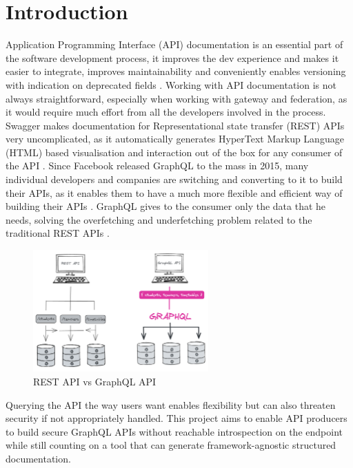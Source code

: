 \section*{Introduction}
\label{s:Introduction}
Application Programming Interface (API) documentation is an essential part of
the software development process, it improves the dev experience and makes it
easier to integrate, improves maintainability and conveniently enables
versioning with indication on deprecated fields
\citep{fanWhyAPIDocumentation2021}. Working with API documentation is not always
straightforward, especially when working with gateway and federation, as it
would require much effort from all the developers involved in the process.
Swagger makes documentation for Representational state transfer (REST) APIs very
uncomplicated, as it automatically generates HyperText Markup Language (HTML)
based visualisation and interaction out of the box for any consumer of the API
\citep{korenExploitationOpenAPIDocumentation2018}. Since Facebook released
GraphQL to the mass in 2015, many individual developers and companies are
switching and converting to it to build their APIs, as it enables them to have a
much more flexible and efficient way of building their APIs
\citep{britoRESTVsGraphQL2020}. GraphQL gives to the consumer only the data that
he needs, solving the overfetching and underfetching problem related to the
traditional REST APIs \citep{witternGeneratingGraphQLWrappersREST2018}.
\begin{figure}[H]
  \centering
  \includegraphics[width=0.6\textwidth]{figures/restvsgraph}
  \caption{REST API vs GraphQL API}
  \label{f:restvsgraph}
\end{figure}
Querying the API the way users want enables flexibility but can also threaten
security if not appropriately handled. This project aims to enable API producers
to build secure GraphQL APIs without reachable introspection on the endpoint
while still counting on a tool that can generate framework-agnostic structured
documentation.

